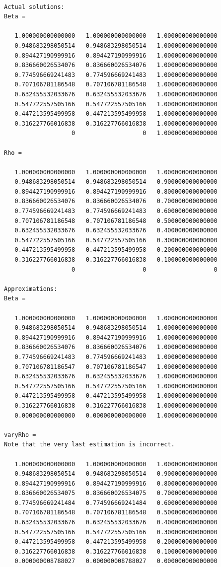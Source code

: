 \documentclass[11pt]{amsart}
\begin{document}
\begin{lstlisting}

Actual solutions:
Beta =

   1.000000000000000   1.000000000000000   1.000000000000000
   0.948683298050514   0.948683298050514   1.000000000000000
   0.894427190999916   0.894427190999916   1.000000000000000
   0.836660026534076   0.836660026534076   1.000000000000000
   0.774596669241483   0.774596669241483   1.000000000000000
   0.707106781186548   0.707106781186548   1.000000000000000
   0.632455532033676   0.632455532033676   1.000000000000000
   0.547722557505166   0.547722557505166   1.000000000000000
   0.447213595499958   0.447213595499958   1.000000000000000
   0.316227766016838   0.316227766016838   1.000000000000000
                   0                   0   1.000000000000000
                   
Rho =

   1.000000000000000   1.000000000000000   1.000000000000000
   0.948683298050514   0.948683298050514   0.900000000000000
   0.894427190999916   0.894427190999916   0.800000000000000
   0.836660026534076   0.836660026534076   0.700000000000000
   0.774596669241483   0.774596669241483   0.600000000000000
   0.707106781186548   0.707106781186548   0.500000000000000
   0.632455532033676   0.632455532033676   0.400000000000000
   0.547722557505166   0.547722557505166   0.300000000000000
   0.447213595499958   0.447213595499958   0.200000000000000
   0.316227766016838   0.316227766016838   0.100000000000000
                   0                   0                   0

Approximations:
Beta =

   1.000000000000000   1.000000000000000   1.000000000000000
   0.948683298050514   0.948683298050514   1.000000000000000
   0.894427190999916   0.894427190999916   1.000000000000000
   0.836660026534076   0.836660026534076   1.000000000000000
   0.774596669241483   0.774596669241483   1.000000000000000
   0.707106781186547   0.707106781186547   1.000000000000000
   0.632455532033676   0.632455532033676   1.000000000000000
   0.547722557505166   0.547722557505166   1.000000000000000
   0.447213595499958   0.447213595499958   1.000000000000000
   0.316227766016838   0.316227766016838   1.000000000000000
   0.000000000000000   0.000000000000000   1.000000000000000

varyRho =
Note that the very last estimation is incorrect.

   1.000000000000000   1.000000000000000   1.000000000000000
   0.948683298050514   0.948683298050514   0.900000000000000
   0.894427190999916   0.894427190999916   0.800000000000000
   0.836660026534075   0.836660026534075   0.700000000000000
   0.774596669241484   0.774596669241484   0.600000000000000
   0.707106781186548   0.707106781186548   0.500000000000000
   0.632455532033676   0.632455532033676   0.400000000000000
   0.547722557505166   0.547722557505166   0.300000000000000
   0.447213595499958   0.447213595499958   0.200000000000000
   0.316227766016838   0.316227766016838   0.100000000000000
   0.000000008788027   0.000000008788027   0.000000000000000


\end{lstlisting}
\end{document}
